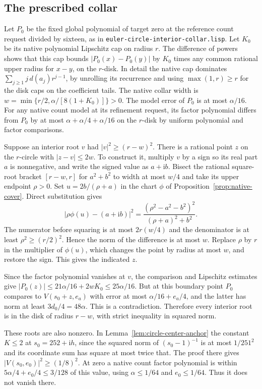\documentclass[11pt]{amsart}
\theoremstyle{definition}
\theoremstyle{remark}
\numberwithin{equation}{section}
\newcommand{\code}[1]{\nolinkurl{#1}}
\begin{document}
\subsection{The prescribed collar}

Let $P_0$ be the fixed global polynomial of target zero at
the reference count request divided by sixteen, as in
\code{euler-circle-interior-collar.lisp}. Let $K_0$ be its
native polynomial Lipschitz cap on radius $r$.
The difference of powers shows that this cap bounds
$|P_0(x)-P_0(y)|$ by $K_0$ times any common rational
upper radius for $x-y$, on the $r$-disk.
In detail the native cap dominates
$\sum_{j\ge1}j\,d(a_j)r^{j-1}$, by unrolling its
recurrence and using $\max(1,r)\ge r$ for the disk caps
on the coefficient tails. The native collar width is
$w=\min\{r/2,\alpha/[8(1+K_0)]\}>0$.
The model error of $P_0$ is at most $\alpha/16$.
For any native count model at its refinement request,
its factor polynomial differs from $P_0$ by at most
$\alpha+\alpha/4+\alpha/16$ on the $r$-disk by
uniform polynomial and factor comparisons.

Suppose an interior root $v$ had $|v|^2\ge(r-w)^2$.
There is a rational point $z$ on the $r$-circle with
$|z-v|\le2w$. To construct it, multiply $v$ by a sign
so its real part $a$ is nonnegative, and write the
signed value as $a+\mathrm ib$. Bisect the rational
square-root bracket $[r-w,r]$ for $a^2+b^2$ to width
at most $w/4$ and take its upper endpoint $\rho>0$.
Set $u=2b/(\rho+a)$ in the chart $\phi$ of
Proposition~\ref{prop:native-cover}. Direct substitution
gives
\[
 \left|\rho\phi(u)-(a+\mathrm ib)\right|^2
   =\frac{(\rho^2-a^2-b^2)^2}{(\rho+a)^2+b^2}.
\]
The numerator before squaring is at most $2r(w/4)$
and the denominator is at least $\rho^2\ge(r/2)^2$.
Hence the norm of the difference is at most $w$.
Replace $\rho$ by $r$ in the multiplier of $\phi(u)$,
which changes the point by radius at most $w$, and
restore the sign. This gives the indicated $z$.

Since the factor polynomial vanishes at $v$, the
comparison and Lipschitz estimates give
$|P_0(z)|\le21\alpha/16+2w K_0\le25\alpha/16$.
But at this boundary point
$P_0$ compares to $V(s_0+z,e_a)$ with error at most
$\alpha/16+e_a/4$, and the latter has norm at least
$3d_0/4=48\alpha$. This is a contradiction.
Therefore every interior root is in the disk of radius
$r-w$, with strict inequality in squared norm.

These roots are also nonzero. In Lemma~\ref{lem:circle-center-anchor}
the constant $K\le2$ at $s_0=252+\mathrm ih$, since the
squared norm of $(s_0-1)^{-1}$ is at most $1/251^2$
and its coordinate sum has square at most twice that.
The proof there gives $|V(s_0,e_0)|^2\ge(1/8)^2$.
At zero a native count factor polynomial is within
$5\alpha/4+e_0/4\le3/128$ of this value, using
$\alpha\le1/64$ and $e_0\le1/64$. Thus it does
not vanish there.
\end{document}
